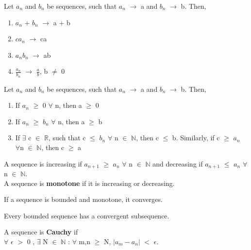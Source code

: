 \documentclass{report}
\begin{document}
\begin{theorem}
Let $a_n$ and $b_n$ be sequences, such that $a_n$ $\rightarrow$ a and $b_n$ $\rightarrow$ b. Then,
\begin{enumerate}
\item $a_n$ + $b_n$ $\rightarrow$ a + b
\item $ca_n$ $\rightarrow$ ca
\item $a_n b_n$ $\rightarrow$ ab
\item $\frac{a_n}{b_n}$ $\rightarrow$ $\frac{a}{b}$, b $\neq$ 0
\end{enumerate}
\end{theorem}

\begin{theorem}
Let $a_n$ and $b_n$ be sequences, such that $a_n$ $\rightarrow$ a and $b_n$ $\rightarrow$ b. Then,
\begin{enumerate}
\item If $a_n$ $\geq$ 0 $\forall$ n, then a $\geq$ 0
\item If $a_n$ $\geq$ $b_n$ $\forall$ n, then a $\geq$ b
\item If $\exists$ c $\in$ $\mathbb{R}$, such that c $\leq$ $b_n$ $\forall$ n $\in$ $\mathbb{N}$, then c $\leq$ b. Similarly, if c $\geq$ $a_n$ \\ $\forall$n $\in$ $\mathbb{N}$, then c $\geq$ a
\end{enumerate}
\end{theorem}
\begin{definition}
A sequence is increasing if $a_{n+1}$ $\geq$ $a_n$ $\forall$ n $\in$ $\mathbb{N}$ and decreasing if  $a_{n+1}$ $\leq$ $a_n$ $\forall$ n $\in$ $\mathbb{N}$. \\
A sequence is \textbf{monotone} if it is increasing or decreasing.
\end{definition}

\begin{theorem}
If a sequence is bounded and monotone, it converges.
\end{theorem}

\begin{theorem}
Every bounded sequence has a convergent subsequence.
\end{theorem}

\begin{definition}
A sequence is \textbf{Cauchy} if\\
$\forall$ $\epsilon$ $>$ 0 , $\exists$ N $\in$ $\mathbb{N}$ : $\forall$ m,n $\geq$ N, $\lvert a_m - a_n \rvert$ $<$ $\epsilon$.
\end{definition}
\end{document}
